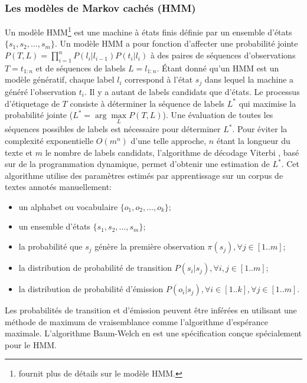 \subsubsection{Les modèles de Markov cachés (HMM)}
\label{sec:structuration:litérature-HMM}
Un modèle HMM\footnote{\citet{rabiner1989tutorial} fournit plus de détails sur le modèle HMM.} est une machine à états finis définie par un ensemble d'états $ \lbrace s_1, s_2, ..., s_m \rbrace $. Un modèle HMM a pour fonction d'affecter une probabilité jointe 
$ P (T , L) = \prod\limits_{i=1}^n P(l_i \vert l_{i-1})P(t_i \vert l_i)$  à des paires de séquences d'observations $ T = t_{1: n} $ et de séquences de labels $ L = l_{1:n} $. Étant donné qu'un HMM est un modèle génératif, chaque label $l_i$ correspond à l'état $s_j$ dans lequel la machine a généré l'observation $t_i$. Il y a autant de labels candidats que d'états. Le processus d'étiquetage de $T$ consiste à déterminer la séquence de labels $ L^* $ qui maximise la probabilité jointe ($L^* = \arg \max\limits_L P(T, L)$). Une évaluation de toutes les séquences possibles de labels est nécessaire pour déterminer $L^*$. Pour éviter la complexité exponentielle $ O(m^n)$ d'une telle approche, $n$ étant la longueur du texte et $m$ le nombre de labels candidats, l'algorithme de décodage Viterbi \citep{viterbi1967viterbi}, basé sur de la  programmation dynamique, permet d'obtenir une estimation de $L^*$. Cet algorithme utilise des paramètres estimés par apprentissage sur un corpus de textes annotés manuellement:
\begin{itemize}
\item un alphabet ou vocabulaire $ \lbrace o_1, o_2, ..., o_k \rbrace $;
\item un ensemble d'états $ \lbrace s_1, s_2, ..., s_m \rbrace $;
\item la probabilité que $ s_j $ génère la première observation $ \pi(s_j), \forall j \in [1 .. m] $;
\item la distribution de probabilité de transition $ P (s_i\vert s_j),  \forall i,j \in [1 .. m] $;
\item la distribution de probabilité d'émission $ P(o_i\vert s_j), \forall i \in [1 .. k], \forall j \in [1 .. m]$.
\end{itemize}

Les probabilités de transition et d'émission peuvent être inférées en utilisant une méthode de maximum de vraisemblance comme l'algorithme d'espérance maximale. L'algorithme Baum-Welch \citep{welch2003baumwelch} en est une spécification conçue spécialement pour le HMM. 

